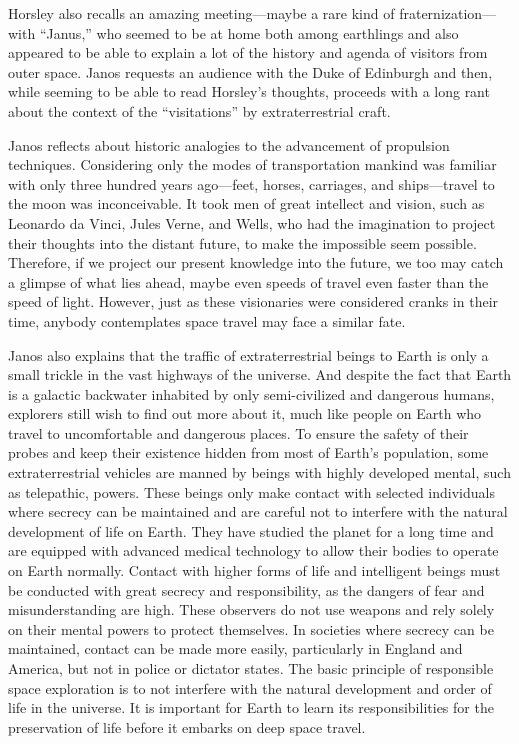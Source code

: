 Horsley also recalls an amazing meeting---maybe a rare kind of fraternization---with ``Janus,''
who seemed to be at home both among earthlings and also appeared to be able to explain a
lot of the history and agenda of visitors from outer space.
Janos requests an audience with the Duke of Edinburgh and  then, while seeming to be able to read Horsley's thoughts,
proceeds with a long rant about the context of the ``visitations'' by extraterrestrial craft.

Janos reflects about historic analogies to the advancement of propulsion techniques.
Considering only the modes of transportation mankind was familiar with only three hundred years ago---feet, horses, carriages, and ships---travel to the moon was inconceivable.
It took men of great intellect and vision, such as Leonardo da Vinci, Jules Verne, and Wells, who had the imagination to project their thoughts into the distant future,
to make the impossible seem possible. Therefore, if we project our present knowledge into the future, we too may catch a glimpse of what lies ahead,
maybe even speeds of travel even faster than the speed of light.
However, just as these visionaries were considered cranks in their time, anybody contemplates space travel  may face a similar fate.

Janos also explains that
the traffic of extraterrestrial beings to Earth is only a small trickle in the vast highways of the universe.
And despite the fact that Earth is a galactic backwater inhabited by only semi-civilized and dangerous humans,
explorers still wish to find out more about it, much like people on Earth who travel to uncomfortable and dangerous places.
To ensure the safety of their probes and keep their existence hidden from most of Earth's population,
some extraterrestrial vehicles are manned by beings with highly developed mental, such as telepathic, powers.
These beings only make contact with selected individuals where secrecy can be maintained and are careful
not to interfere with the natural development of life on Earth.
 They have studied the planet for a long time and are equipped with advanced medical technology to allow their bodies to operate on Earth normally.
Contact with higher forms of life and intelligent beings must be conducted with great secrecy and responsibility,
as the dangers of fear and misunderstanding are high.
These observers do not use weapons and rely solely on their mental powers to protect themselves.
In societies where secrecy can be maintained, contact can be made more easily, particularly in England and America,
but not in police or dictator states.
The basic principle of responsible space exploration is to not interfere with the natural development and order of life in the universe.
It is important for Earth to learn its responsibilities for the preservation of life before it embarks on deep space travel.

